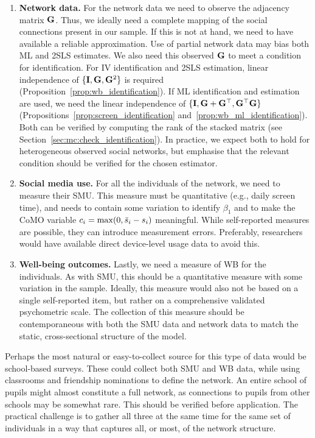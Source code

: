\begin{enumerate}
    \item \textbf{Network data.} For the network data we need to observe the adjacency matrix $\mathbf{G}$. Thus, we ideally need a complete mapping of the social connections present in our sample. If this is not at hand, we need to have available a reliable approximation. Use of partial network data may bias both ML and 2SLS estimates. We also need this observed $\mathbf{G}$ to meet a condition for identification. For IV identification and 2SLS estimation, linear independence of $\{\mathbf{I}, \mathbf{G}, \mathbf{G}^2\}$ is required (Proposition~\ref{prop:wb_identification}). If ML identification and estimation are used, we need the linear independence of $\{\mathbf{I}, \mathbf{G} + \mathbf{G}^\top, \mathbf{G}^\top\mathbf{G}\}$ (Propositions~\ref{prop:screen_identification} and~\ref{prop:wb_ml_identification}). Both can be verified by computing the rank of the stacked matrix (see Section~\ref{sec:mc:check_identification}). In practice, we expect both to hold for heterogeneous observed social networks, but emphasise that the relevant condition should be verified for the chosen estimator.

    \item \textbf{Social media use.} For all the individuals of the network, we need to measure their SMU\@. This measure must be quantitative (e.g., daily screen time), and needs to contain some variation to identify $\beta_1$ and to make the CoMO variable $c_i = \max(0, \bar{s}_i - s_i)$ meaningful. While self-reported measures are possible, they can introduce measurement errors. Preferably, researchers would have available direct device-level usage data to avoid this.

    \item \textbf{Well-being outcomes.} Lastly, we need a measure of WB for the individuals. As with SMU, this should be a quantitative measure with some variation in the sample. Ideally, this measure would also not be based on a single self-reported item, but rather on a comprehensive validated psychometric scale. The collection of this measure should be contemporaneous with both the SMU data and network data to match the static, cross-sectional structure of the model.
\end{enumerate}

Perhaps the most natural or easy-to-collect source for this type of data would be school-based surveys. These could collect both SMU and WB data, while using classrooms and friendship nominations to define the network. An entire school of pupils might almost constitute a full network, as connections to pupils from other schools may be somewhat rare. This should be verified before application. The practical challenge is to gather all three at the same time for the same set of individuals in a way that captures all, or most, of the network structure.

